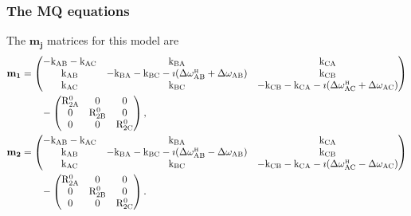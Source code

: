\subsubsection{The MQ equations}

The $\mathbf{m_j}$ matrices for this model are
\begin{subequations}
\begin{align}
    \mathbf{m_1} &= \begin{pmatrix}
                        -\kAB -\kAC & \kBA                                  & \kCA \\
                        \kAB        & -\kBA -\kBC -\imath(\dwHAB + \dwAB)   & \kCB \\
                        \kAC        & \kBC                                  & -\kCB -\kCA -\imath(\dwHAC + \dwAC)
                    \end{pmatrix}  \nonumber \\
                 &\qquad - \begin{pmatrix}
                               \RtwozeroA & 0          & 0    \\
                               0          & \RtwozeroB & 0    \\
                               0          & 0          & \RtwozeroC
                           \end{pmatrix}, \\
    \mathbf{m_2} &= \begin{pmatrix}
                        -\kAB -\kAC & \kBA                                  & \kCA \\
                        \kAB        & -\kBA -\kBC -\imath(\dwHAB - \dwAB)   & \kCB \\
                        \kAC        & \kBC                                  & -\kCB -\kCA -\imath(\dwHAC - \dwAC)
                    \end{pmatrix}  \nonumber \\
                 &\qquad - \begin{pmatrix}
                               \RtwozeroA & 0          & 0    \\
                               0          & \RtwozeroB & 0    \\
                               0          & 0          & \RtwozeroC
                           \end{pmatrix}.
\end{align}
\end{subequations}

